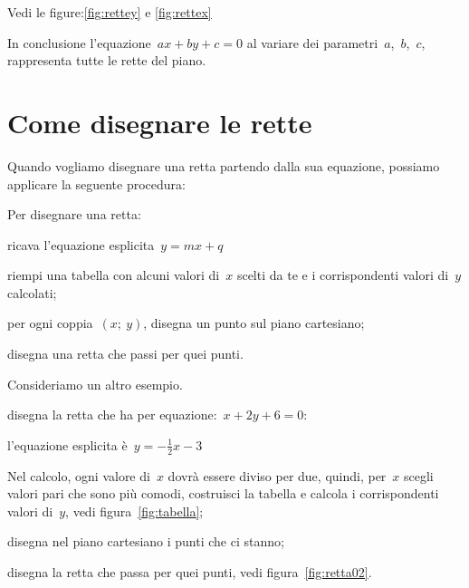 Vedi le figure:\ref{fig:rettey} e \ref{fig:rettex}

In conclusione l'equazione~$ax + by + c = 0$ al variare dei 
parametri~$a$,~$b$,~$c$, rappresenta tutte le rette del piano.

\section{Come disegnare le rette}
\label{sec:retta_disegno}

Quando vogliamo disegnare una retta partendo dalla sua equazione, possiamo
applicare la seguente procedura:

\begin{procedura}
 Per disegnare una retta:
 \begin{enumeratea}
  \item ricava l'equazione esplicita~$y=mx+q$
  \item riempi una tabella con alcuni valori di~$x$ scelti da te e i 
   corrispondenti valori di~$y$ calcolati;
  \item per ogni coppia~$(x;~y)$, disegna un punto sul piano cartesiano;
  \item disegna una retta che passi per quei punti.
 \end{enumeratea}
\end{procedura}

Consideriamo un altro esempio. 

\begin{procedura}
 disegna la retta che ha per equazione:~$x+2y+6=0$:
 \begin{enumeratea}
  \item l'equazione esplicita è~$y=- \frac{1}{2}x - 3$
  \item Nel calcolo, ogni valore di~$x$ dovrà essere diviso per due, 
   quindi, per~$x$ scegli valori pari che sono più comodi, costruisci la 
   tabella e calcola i corrispondenti valori di~$y$, 
   vedi figura~\ref{fig:tabella};
  \item disegna nel piano cartesiano i punti che ci stanno;
  \item disegna la retta che passa per quei punti, 
   vedi figura~\ref{fig:retta02}.
 \end{enumeratea}
\end{procedura}

